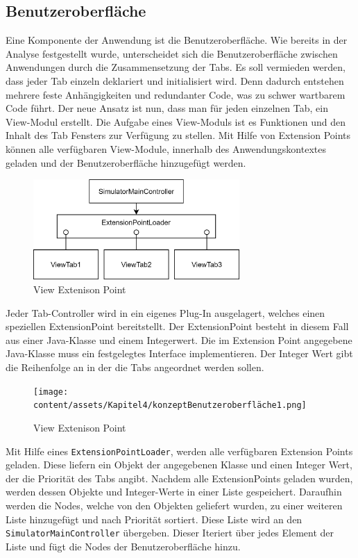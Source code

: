 \subsection{Benutzeroberfläche}

Eine Komponente der Anwendung ist die Benutzeroberfläche. Wie bereits in der Analyse festgestellt wurde, unterscheidet sich die Benutzeroberfläche zwischen Anwendungen durch die Zusammensetzung der Tabs. Es soll vermieden werden, dass jeder Tab einzeln deklariert und initialisiert wird. Denn dadurch entstehen mehrere feste Anhängigkeiten und redundanter Code, was zu schwer wartbarem Code führt. Der neue Ansatz ist nun, dass man für jeden einzelnen Tab, ein View-Modul erstellt. Die Aufgabe eines View-Moduls ist es Funktionen und den Inhalt des Tab Fensters zur Verfügung zu stellen. Mit Hilfe von Extension Points können alle verfügbaren View-Module, innerhalb des Anwendungskontextes geladen und der Benutzeroberfläche hinzugefügt werden.


\begin{figure}[ht]
    \centering
    \includegraphics[width=0.7\textwidth]{content/assets/Kapitel4/ExtensionPointEasy.png}
    \caption{View Extenison Point}

\end{figure}

Jeder Tab-Controller wird in ein eigenes Plug-In ausgelagert, welches einen speziellen ExtensionPoint bereitstellt. Der ExtensionPoint besteht in diesem Fall aus einer Java-Klasse und einem Integerwert. Die im Extension Point angegebene Java-Klasse muss ein festgelegtes Interface implementieren. Der Integer Wert gibt die Reihenfolge an in der die Tabs angeordnet werden sollen.

\begin{figure}[ht]
    \centering
    \texttt{[image: content/assets/Kapitel4/konzeptBenutzeroberfläche1.png]}
    \caption{View Extenison Point}
\end{figure}


Mit Hilfe eines \texttt{ExtensionPointLoader}, werden alle verfügbaren Extension Points geladen. Diese liefern ein Objekt der angegebenen Klasse und einen Integer Wert, der die Priorität des Tabs angibt. Nachdem alle ExtensionPoints geladen wurden, werden dessen Objekte und Integer-Werte in einer Liste gespeichert. Daraufhin werden die Nodes, welche von den Objekten geliefert wurden, zu einer weiteren Liste hinzugefügt und nach Priorität sortiert. Diese Liste wird an den \texttt{SimulatorMainController} übergeben. Dieser Iteriert über jedes Element der Liste und fügt die Nodes der Benutzeroberfläche hinzu. 

